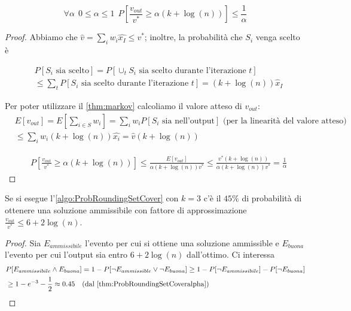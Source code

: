 \begin{theorem} \label{thm:ProbRoundingSetCoveralpha}
	$$\forall \alpha  ~~ 0 \leq \alpha \leq 1 ~~ P[\frac{v_{out}}{v^*}\geq \alpha (k + \log(n))] \leq \frac{1}{\alpha}$$
\end{theorem}
\begin{proof}
	Abbiamo che $\hat{v} = \sum_{i} w_i \hat{x_I} \leq v^*$; inoltre,
	la probabilità che $S_i$ venga scelto è

	\begin{align*}
		 & P[ S_i \text{ sia scelto}] = P[ \cup_{t} S_i \text{ sia scelto durante l'iterazione } t] \\
		 & \leq \sum_t P[S_i \text{ sia scelto durante l'iterazione } t] = (k + \log (n))\hat{x}_I
	\end{align*}

	Per poter utilizzare il \cref{thm:markov} calcoliamo il valore atteso di $v_{out}$:
	\begin{align*}
		 & E[v_{out}]  = E[\sum_{i \in S} w_i] =
		\sum_{i} w_i P[S_i \text{ sia nell'output}] \text{ (per la linearità del valore atteso) } \\
		 & \leq \sum_i w_i (k + \log(n)) \hat{x_i} = \hat{v} (k + \log(n))
	\end{align*}

	\begin{align*}
		 & P  [ \frac{v_{out}}{v^*} \geq\alpha (k + \log(n))] \leq \frac{E[v_{out}]}{\alpha (k + \log(n))v^*}
		\leq \frac{v^* (k + \log(n))}{\alpha (k + \log(n))v^*} = \frac{1}{\alpha}
	\end{align*}
\end{proof}

\begin{oss}
	Se si esegue l'\cref{algo:ProbRoundingSetCover} con $k = 3$ c'è il $45\%$ di probabilità di ottenere
	una soluzione ammissibile con fattore di approssimazione $\frac{v_{out}}{v^*}\leq 6 + 2 \log (n)$.
\end{oss}
\begin{proof}
	Sia $E_{ammissibile}$ l'evento per cui si ottiene una soluzione ammissible e
	$E_{buona}$ l'evento per cui l'output sia entro $6 + 2 \log(n)$ dall'ottimo.
	Ci interessa
	\begin{align*}
		 & P[E_{ammissibile} \land E_{buona}] = 1 - P[\neg E_{ammissible} \lor
		\neg E_{buona}] \geq 1 - P[\neg E_{ammissibile}] - P[\neg E_{buona}]                                  \\
		 & \geq 1 - e^{-3} - \frac{1}{2} \approx 0.45  ~~~  (\text{dal \cref{thm:ProbRoundingSetCoveralpha}})
	\end{align*}
\end{proof}

